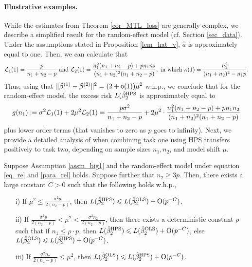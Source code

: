 \paragraph{Illustrative examples.}
While the estimates from Theorem \ref{cor_MTL_loss} are generally complex, we describe a simplified result for the random-effect model (cf. Section \ref{sec_data}).
Under the assumptions stated in Proposition \ref{lem_hat_v}, $\hat{a}$ is approximately equal to one.
Then, we can calculate that
\[ \mathcal{L}_1(1) = \frac{p}{n_1 + n_2 - p} \text{ and } \mathcal{L}_2(1) = \frac{n_1^2(n_1 + n_2 - p) + p n_1 n_2}{(n_1 + n_2)^2 (n_1 + n_2 - p)}, \text{ in which } \kappa(1) = \frac{n_2^2}{(n_1 + n_2)^2 - n_1 p}. \]
Thus, using that $\|\beta^{(1)}-\beta^{(2)}\|^2 = (2+\operatorname{o}(1))\mu^2$ w.h.p., we conclude that for the random-effect model, the excess risk $L(\hat{\beta}_2^{\textup{HPS}}$ is approximately equal to
$$ g(n_1) := \sigma^2 \mathcal L_1(1) +   2\mu^2 \mathcal L_2(1)= \frac{p\sigma^2}{n_1+n_2-p} +  2\mu^2 \cdot \frac{n_1^2 (n_1+n_2-p)+p n_1n_2}{(n_1+n_2)^2(n_1+n_2-p)}$$
plus lower order terms (that vanishes to zero as $p$ goes to infinity).
Next, we provide a detailed analysis of when combining task one using HPS transfers positively to task two, depending on sample sizes $n_1, n_2$, and model shift $\mu$.

\begin{claim}\label{claim_model_shift}
    Suppose Assumption \ref{assm_big1} and the random-effect model under equation \eqref{eq_re} and \eqref{para_rel} holds.
    Suppose further that $n_2 \ge 3p$.
    Then, there exists a large constant $C > 0$ such that the following holds w.h.p.,
    \begin{enumerate}
        \item[i)] If $\mu^2 \le \frac{\sigma^2 p}{2(n_2 - p)}$, then $L(\hat{\beta}_2^{\textup{HPS}}) \leqslant L(\hat{\beta}_2^{\textup{OLS}}) + \operatorname{O}(p^{-C})$.
        \item[ii)] If $\frac{\sigma^2 p}{2(n_2 - p)} < \mu^2 < \frac{\sigma^2 n_2}{2(n_2 - p)}$, then there exists a deterministic constant $\rho$ such that if $n_1 \le \rho\cdot p$, then $L(\hat{\beta}_2^{\textup{HPS}}) \leqslant L(\hat{\beta}_2^{\textup{OLS}}) + \operatorname{O}(p^{-C})$, else $L(\hat{\beta}_2^{\textup{OLS}}) \leqslant L(\hat{\beta}_2^{\textup{HPS}}) + \operatorname{O}(p^{-C})$.
        \item[iii)] If $\frac{\sigma^2 n_2} {2(n_2 - p)} \le \mu^2$, then $L(\hat{\beta}_2^{\textup{OLS}}) \leqslant L(\hat{\beta}_2^{\textup{HPS}}) + \operatorname{O}(p^{-C})$.
    \end{enumerate}
\end{claim}

